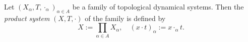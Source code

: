 \begin{definition}
  Let $(X_\alpha,T, \cdot_\alpha)_{\alpha \in A}$ be a family of topological dynamical systems.
  Then the \emph{product system} $(X, T, \cdot)$ of the family is defined by
  \begin{equation*}
    X := \prod_{\alpha \in A} X_\alpha, \quad (x\cdot t)_{\alpha} := x \cdot_\alpha t.
  \end{equation*}
\end{definition}
